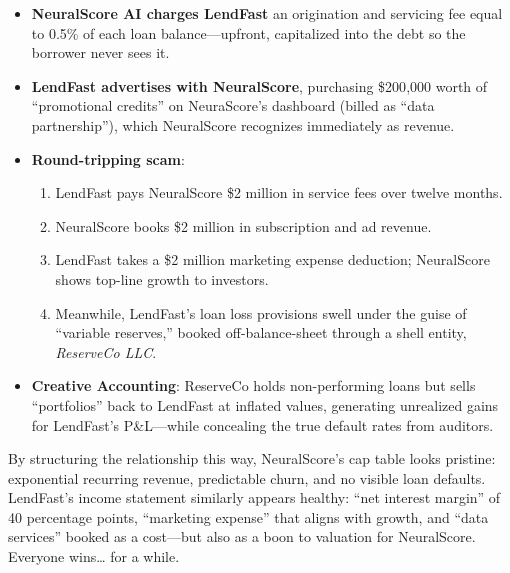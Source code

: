 \medskip

\begin{itemize}
  \item  \textbf{NeuralScore AI charges LendFast} an origination and servicing fee equal to 0.5\% of each loan balance—upfront, capitalized into the debt so the borrower never sees it.
  \item  \textbf{LendFast advertises with NeuralScore}, purchasing \$200{,}000 worth of “promotional credits” on NeuraScore’s dashboard (billed as “data partnership”), which NeuralScore recognizes immediately as revenue.
  \item  \textbf{Round-tripping scam}:
    \begin{enumerate}
      \item  LendFast pays NeuralScore \$2 million in service fees over twelve months.
      \item  NeuralScore books \$2 million in subscription and ad revenue.
      \item  LendFast takes a \$2 million marketing expense deduction; NeuralScore shows top-line growth to investors.
      \item  Meanwhile, LendFast’s loan loss provisions swell under the guise of “variable reserves,” booked off-balance-sheet through a shell entity, \emph{ReserveCo LLC}.
    \end{enumerate}
  \item  \textbf{Creative Accounting}:  ReserveCo holds non-performing loans but sells “portfolios” back to LendFast at inflated values, generating unrealized gains for LendFast’s P\&L—while concealing the true default rates from auditors.
\end{itemize}

By structuring the relationship this way, NeuralScore’s cap table looks pristine: exponential recurring revenue, predictable churn, and no visible loan defaults. LendFast’s income statement similarly appears healthy: “net interest margin” of 40 percentage points, “marketing expense” that aligns with growth, and “data services” booked as a cost—but also as a boon to valuation for NeuralScore. Everyone wins… for a while.

